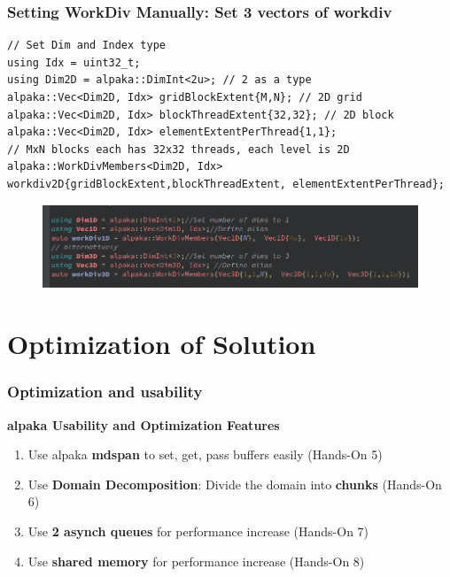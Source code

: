 \documentclass[9pt]{beamer}
\begin{document}
\begin{frame}[fragile]
\frametitle{Setting WorkDiv Manually: Set 3 vectors of workdiv}
\begin{lstlisting}
// Set Dim and Index type
using Idx = uint32_t;
using Dim2D = alpaka::DimInt<2u>; // 2 as a type
alpaka::Vec<Dim2D, Idx> gridBlockExtent{M,N}; // 2D grid
alpaka::Vec<Dim2D, Idx> blockThreadExtent{32,32}; // 2D block
alpaka::Vec<Dim2D, Idx> elementExtentPerThread{1,1};
// MxN blocks each has 32x32 threads, each level is 2D
alpaka::WorkDivMembers<Dim2D, Idx> workdiv2D{gridBlockExtent,blockThreadExtent, elementExtentPerThread};
\end{lstlisting}
\begin{figure}
    \centering
    \includegraphics[width=0.75\linewidth]{workdivManual.png}
\end{figure}

\end{frame}

\section{Optimization of Solution}

\begin{frame}
\frametitle{Optimization and usability}
\begin{center}
      \Huge \textbf{alpaka Usability and Optimization Features}
  \end{center}
\begin{enumerate}
 \item Use alpaka \textbf{mdspan} to set, get, pass buffers easily (Hands-On 5)
 \item Use \textbf{Domain Decomposition}: Divide the domain into \textbf{chunks} (Hands-On 6)
 \item Use \textbf{2 asynch queues} for performance increase (Hands-On 7)
 \item Use \textbf{shared memory} for performance increase (Hands-On 8)
\end{enumerate}
    \end{frame}
\end{document}
